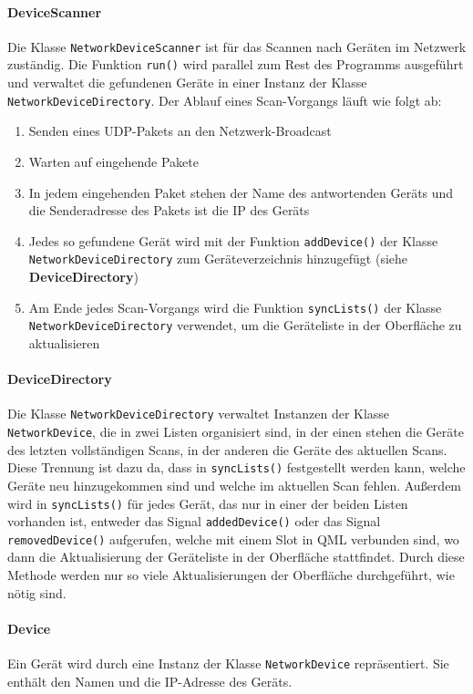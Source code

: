 \documentclass{article}
\begin{document}
    \paragraph{DeviceScanner}
    Die Klasse \texttt{NetworkDeviceScanner} ist für das Scannen nach Geräten im Netzwerk zuständig.
    Die Funktion \texttt{run()} wird parallel zum Rest des Programms ausgeführt und verwaltet die gefundenen Geräte in einer Instanz der Klasse \texttt{NetworkDeviceDirectory}.
    Der Ablauf eines Scan-Vorgangs läuft wie folgt ab:
    \begin{enumerate}
        \item Senden eines UDP-Pakets an den Netzwerk-Broadcast
        \item Warten auf eingehende Pakete
        \item In jedem eingehenden Paket stehen der Name des antwortenden Geräts und die Senderadresse des Pakets ist die IP des Geräts
        \item Jedes so gefundene Gerät wird mit der Funktion \texttt{addDevice()} der Klasse \texttt{NetworkDeviceDirectory} zum Geräteverzeichnis hinzugefügt (siehe \textbf{DeviceDirectory})
        \item Am Ende jedes Scan-Vorgangs wird die Funktion \texttt{syncLists()} der Klasse \texttt{NetworkDeviceDirectory} verwendet, um die Geräteliste in der Oberfläche zu aktualisieren
    \end{enumerate}

    \paragraph{DeviceDirectory}
    Die Klasse \texttt{NetworkDeviceDirectory} verwaltet Instanzen der Klasse \texttt{NetworkDevice}, die in zwei Listen organisiert sind,
    in der einen stehen die Geräte des letzten vollständigen Scans, in der anderen die Geräte des aktuellen Scans.
    Diese Trennung ist dazu da, dass in \texttt{syncLists()} festgestellt werden kann, welche Geräte neu hinzugekommen sind und welche im aktuellen Scan fehlen.
    Außerdem wird in \texttt{syncLists()} für jedes Gerät, das nur in einer der beiden Listen vorhanden ist,
    entweder das Signal \texttt{addedDevice()} oder das Signal \texttt{removedDevice()} aufgerufen, welche mit einem Slot in QML verbunden sind,
    wo dann die Aktualisierung der Geräteliste in der Oberfläche stattfindet.
    Durch diese Methode werden nur so viele Aktualisierungen der Oberfläche durchgeführt, wie nötig sind.

    \paragraph{Device}
    Ein Gerät wird durch eine Instanz der Klasse \texttt{NetworkDevice} repräsentiert.
    Sie enthält den Namen und die IP-Adresse des Geräts.
\end{document}

